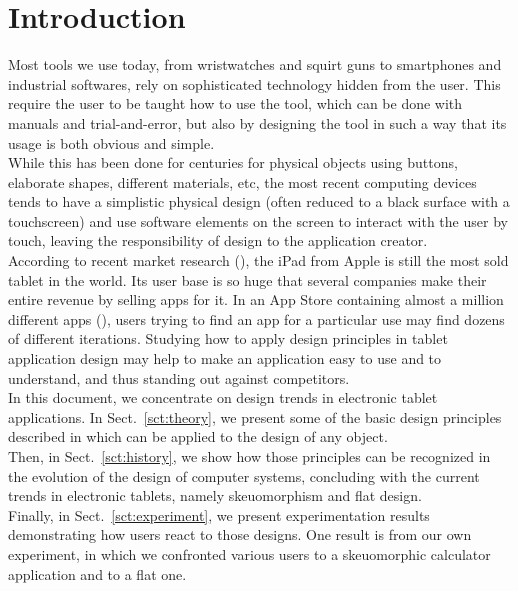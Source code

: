 \documentclass[a4paper,11pt] {article}
\theoremstyle{definition}
\begin{document}
\pagebreak
\tableofcontents
\pagebreak
\section{Introduction}

Most tools we use today, from wristwatches and squirt guns to smartphones and industrial softwares, rely on sophisticated technology hidden from the user. This require the user to be taught how to use the tool, which can be done with manuals and trial-and-error, but also by designing the tool in such a way that its usage is both obvious and simple.\\

While this has been done for centuries for physical objects using buttons, elaborate shapes, different materials, etc, the most recent computing devices tends to have a simplistic physical design (often reduced to a black surface with a touchscreen) and use software elements on the screen to interact with the user by touch, leaving the responsibility of design to the application creator.\\

According to recent market research (\cite{ABI-android}), the iPad from Apple is still the most sold tablet in the world. Its user base is so huge that several companies make their entire revenue by selling apps for it. In an App Store containing almost a million different apps (\cite{iOs61}), users trying to find an app for a particular use may find dozens of different iterations. Studying how to apply design principles in tablet application design may help to make an application easy to use and to understand, and thus standing out against competitors.\\

In this document, we concentrate on design trends in electronic tablet applications. In Sect.~\ref{sct:theory}, we present some of the basic design principles described in \cite{Norman02} which can be applied to the design of any object.\\

Then, in Sect.~\ref{sct:history}, we show how those principles can be recognized in the evolution of the design of computer systems, concluding with the current trends in electronic tablets, namely skeuomorphism and flat design.\\

Finally, in Sect.~\ref{sct:experiment}, we present experimentation results demonstrating how users react to those designs. One result is from our own experiment, in which we confronted various users to a skeuomorphic calculator application and to a flat one.\\
\end{document}
